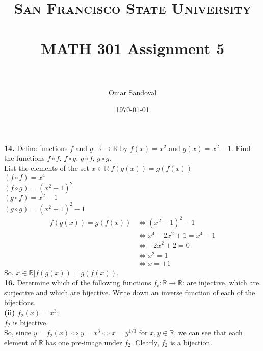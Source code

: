 \documentclass[paper=letter, fontsize=11pt]{scrartcl} %
\title{	
\normalfont \normalsize 
\textsc{San Francisco State University} \\ [25pt]
\horrule{0.5pt} \\[0.4cm] %
\huge MATH 301 Assignment 5  \\ %
\horrule{2pt} \\[0.5cm] %
}
\author{Omar Sandoval}
\date{\normalsize\today}
\begin{document}
\maketitle

\textbf{14.} Define functions $f$ and $g$: $\mathbb{R} \rightarrow \mathbb{R}$ by $f(x) =
x^2$ and $g(x) = x^2-1$. Find the functions $f \circ f$, $f \circ g$, $g \circ f$, $g
\circ g$. \\
List the elements of the set ${x \in \mathbb{R} | f(g(x)) = g(f(x))}$ \\

$(f \circ f) = x^4$ \\
$(f \circ g) = (x^2 -1)^2$ \\
$(g \circ f) = x^2 -1$ \\
$(g \circ g) = (x^2 - 1)^2 -1$ \\

\begin{align*}
    f(g(x)) = g(f(x)) &\Leftrightarrow (x^2 - 1)^2 - 1 \\
    &\Leftrightarrow x^4 - 2x^2 + 1 = x^4 - 1 \\
    &\Leftrightarrow -2x^2 + 2 = 0 \\
    &\Leftrightarrow x^2 = 1 \\
    &\Leftrightarrow x = \pm 1
\end{align*}
So, ${x \in \mathbb{R} | f(g(x)) = g(f(x))}$. \\

\textbf{16.} Determine which of the following functions $f_i: \mathbb{R} \rightarrow
\mathbb{R}$: are injective, which are surjective and which are bijective. Write down an
inverse function of each of the bijections. \\

\textbf{(ii)} $f_2(x) = x^3$; \\

$f_2$ is bijective. \\
So, since $y=f_2(x) \Leftrightarrow y = x^3 \Leftrightarrow x = y^{1/3}$ for $x, y \in 
\mathbb{R}$, we can see that each element of $\mathbb{R}$ has one pre-image under $f_2$.
Clearly, $f_2$ is a bijection. \\
\end{document}
